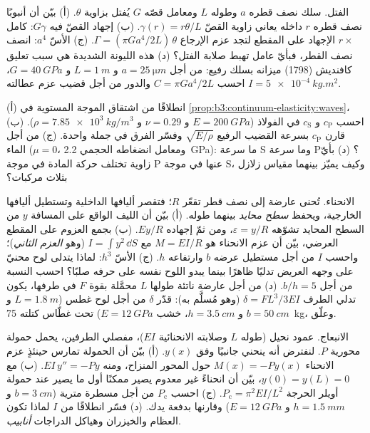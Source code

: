 \begin{exercise}[$\star\star$]\label{exo:b3:continuum-elasticity:8}
الفتل. سلك نصف قطره $a$ وطوله $L$ ومعامل قصّه $G$ يُفتل
بزاوية $\theta$. (أ) بيّن أن أنبوبًا نصف قطره $r$ داخله يعاني
زاوية القصّ $\gamma(r) = r\theta/L$. (ب) إجهاد القصّ فيه
$G\gamma$: كامل $r \times$ الإجهاد على المقطع لتجد عزم
الإرجاع $\Gamma = (\pi Ga^4/2L)\,\theta$. (ج) الأسّ $a^4$:
انصف نصف القطر، فبأيّ عامل تهبط صلابة الفتل؟ (د) هذه الليونة
الشديدة هي سبب تعليق كافنديش (1798) ميزانه بسلك رفيع: من أجل $a = \qty{25}{\micro m}$ و $L =
\qty{1}{m}$ و $G = \qty{40}{GPa}$، احسب $C = \pi Ga^4/2L$ والدور
من أجل قضيب عزم عطالته $I = \qty{5e-4}{kg.m^2}$.
\end{exercise}

\begin{exercise}[$\star\star$]\label{exo:b3:continuum-elasticity:9}
(أ) انطلاقًا من اشتقاق الموجة المستوية في
\cref{prop:b3:continuum-elasticity:waves}، احسب $c_{\text{P}}$ و
$c_{\text{S}}$ في الفولاذ ($E = \qty{200}{GPa}$ و $\nu = 0.29$ و $\rho =
\qty{7.85e3}{kg/m^3}$). (ب) قارن $c_{\text{P}}$ بسرعة القضيب
الرفيع $\sqrt{E/\rho}$ وفسّر الفرق في جملة واحدة. (ج)
من أجل الماء ($\mu = 0$، ومعامل انضغاطه الحجمي \qty{2.2}{GPa}): ما سرعة S
وما سرعة P؟ (د) بأيّ زاوية تختلف حركة المادة في موجة P عنها في
موجة S، وكيف يميّز بينهما مقياس زلازل بثلاث مركبات؟
\end{exercise}

\begin{exercise}[$\star\star\star$]\label{exo:b3:continuum-elasticity:10}
الانحناء. تُحنى عارضة إلى نصف قطر تقعّر $R$؛ فتقصر أليافها
الداخلية وتستطيل أليافها الخارجية، ويحفظ \emph{سطح محايد} بينهما
طوله. (أ) بيّن أن الليف الواقع على المسافة $y$ من السطح المحايد
تشوّهه $\varepsilon = y/R$، ومن ثمّ إجهاده $Ey/R$.
(ب) بجمع العزوم على المقطع العرضي، بيّن أن عزم الانحناء هو
$M = EI/R$ مع $I = \int y^2\,\dd S$ (وهو \emph{العزم الثاني})؛
واحسب $I$ من أجل مستطيل عرضه $b$ وارتفاعه $h$. (ج) الأسّ
$h^3$: لماذا يتدلى لوح محنيّ على وجهه العريض تدليًا ظاهرًا بينما
يبدو اللوح نفسه على حرفه صلبًا؟ احسب النسبة من أجل $b/h = 5$. (د) من أجل
عارضة ناتئة طولها $L$ محمَّلة بقوة $F$ في طرفها، يكون تدلي الطرف
$\delta = FL^3/3EI$ (وهو مُسلَّم به): قدّر $\delta$ من أجل لوح غطس
($L = \qty{1.8}{m}$ و $b = \qty{50}{cm}$ و $h = \qty{3.5}{cm}$، خشب $E
= \qty{12}{GPa}$) تحت غطّاس كتلته \qty{75}{kg}، وعلّق.
\end{exercise}

\begin{exercise}[$\star\star\star$]\label{exo:b3:continuum-elasticity:11}
الانبعاج. عمود نحيل (طوله $L$ وصلابته الانحنائية $EI$)،
مفصلي الطرفين، يحمل حمولة محورية $P$. لنفترض أنه ينحني
جانبيًا وفق $y(x)$. (أ) بيّن أن الحمولة تمارس حينئذٍ عزم الانحناء
$M(x) = -Py(x)$ حول المحور المنزاح، ومنه $EI\,y'' = -Py$. (ب) مع
$y(0) = y(L) = 0$، بيّن أن انحناءً غير معدوم يصير ممكنًا أول ما
يصير عند حمولة أويلر الحرجة
$P_{\text{c}} = \pi^2EI/L^2$. (ج) احسب $P_{\text{c}}$ من أجل مسطرة
مترية ($b = \qty{3}{cm}$ و $h = \qty{1.5}{mm}$ و $E = \qty{12}{GPa}$)
وقارنها بدفعة يدك. (د) فسّر انطلاقًا من $I$ لماذا تكون العظام
والخيزران وهياكل الدراجات \emph{أنابيب}.
\end{exercise}

